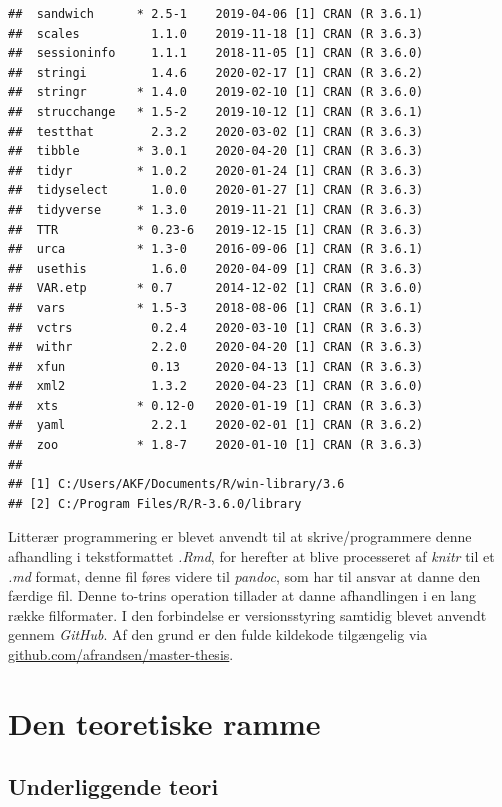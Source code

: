 \documentclass[
  a4paper,
  oneside]{memoir}
\begin{document}
\begin{verbatim}
##  sandwich      * 2.5-1    2019-04-06 [1] CRAN (R 3.6.1)   
##  scales          1.1.0    2019-11-18 [1] CRAN (R 3.6.3)   
##  sessioninfo     1.1.1    2018-11-05 [1] CRAN (R 3.6.0)   
##  stringi         1.4.6    2020-02-17 [1] CRAN (R 3.6.2)   
##  stringr       * 1.4.0    2019-02-10 [1] CRAN (R 3.6.0)   
##  strucchange   * 1.5-2    2019-10-12 [1] CRAN (R 3.6.1)   
##  testthat        2.3.2    2020-03-02 [1] CRAN (R 3.6.3)   
##  tibble        * 3.0.1    2020-04-20 [1] CRAN (R 3.6.3)   
##  tidyr         * 1.0.2    2020-01-24 [1] CRAN (R 3.6.3)   
##  tidyselect      1.0.0    2020-01-27 [1] CRAN (R 3.6.3)   
##  tidyverse     * 1.3.0    2019-11-21 [1] CRAN (R 3.6.3)   
##  TTR           * 0.23-6   2019-12-15 [1] CRAN (R 3.6.3)   
##  urca          * 1.3-0    2016-09-06 [1] CRAN (R 3.6.1)   
##  usethis         1.6.0    2020-04-09 [1] CRAN (R 3.6.3)   
##  VAR.etp       * 0.7      2014-12-02 [1] CRAN (R 3.6.0)   
##  vars          * 1.5-3    2018-08-06 [1] CRAN (R 3.6.1)   
##  vctrs           0.2.4    2020-03-10 [1] CRAN (R 3.6.3)   
##  withr           2.2.0    2020-04-20 [1] CRAN (R 3.6.3)   
##  xfun            0.13     2020-04-13 [1] CRAN (R 3.6.3)   
##  xml2            1.3.2    2020-04-23 [1] CRAN (R 3.6.0)   
##  xts           * 0.12-0   2020-01-19 [1] CRAN (R 3.6.3)   
##  yaml            2.2.1    2020-02-01 [1] CRAN (R 3.6.2)   
##  zoo           * 1.8-7    2020-01-10 [1] CRAN (R 3.6.3)   
## 
## [1] C:/Users/AKF/Documents/R/win-library/3.6
## [2] C:/Program Files/R/R-3.6.0/library
\end{verbatim}

Litterær programmering er blevet anvendt til at skrive/programmere denne afhandling i tekstformattet \emph{.Rmd}, for herefter at blive processeret af \emph{knitr} til et \emph{.md} format, denne fil føres videre til \emph{pandoc}, som har til ansvar at danne den færdige fil. Denne to-trins operation tillader at danne afhandlingen i en lang række filformater. I den forbindelse er versionsstyring samtidig blevet anvendt gennem \emph{GitHub}. Af den grund er den fulde kildekode tilgængelig via \href{https://github.com/afrandsen/master-thesis}{github.com/afrandsen/master-thesis}.

\newpage

\part{Den teoretiske ramme}

\hypertarget{unteo}{%
\chapter{Underliggende teori}\label{unteo}}
\end{document}
